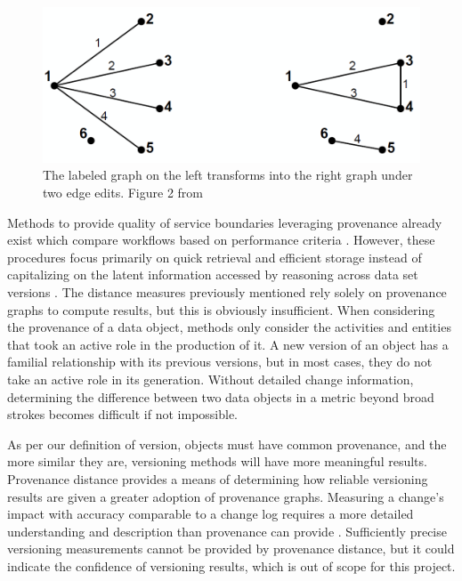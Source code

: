 \begin{figure}
	\centering
	\includegraphics[scale=0.40]{figures/GraphEdit.png}
	\caption[The labeled graph on the left transforms into the right graph under two edge edits.]{The labeled graph on the left transforms into the right graph under two edge edits. Figure 2 from \cite{Goddard:1996:DGU:246962.246972}}
	\label{GraphEdit}
\end{figure}

Methods to provide quality of service boundaries leveraging provenance already exist which compare workflows based on performance criteria \cite{2015:CAA:2778374.2778504}.
However, these procedures focus primarily on quick retrieval and efficient storage instead of capitalizing on the latent information accessed by reasoning across data set versions \cite{tan2004research}.
The distance measures previously mentioned rely solely on provenance graphs to compute results, but this is obviously insufficient.
When considering the provenance of a data object, methods only consider the activities and entities that took an active role in the production of it.
A new version of an object has a familial relationship with its previous versions, but in most cases, they do not take an active role in its generation.
Without detailed change information, determining the difference between two data objects in a metric beyond broad strokes becomes difficult if not impossible.

As per our definition of version, objects must have common provenance, and the more similar they are, versioning methods will have more meaningful results.
Provenance distance provides a means of determining how reliable versioning results are given a greater adoption of provenance graphs.
Measuring a change's impact with accuracy comparable to a change log requires a more detailed understanding and description than provenance can provide  \cite{Bose:2005:LRS:1057977.1057978}.
Sufficiently precise versioning measurements cannot be provided by provenance distance, but it could indicate the confidence of versioning results, which is out of scope for this project.

